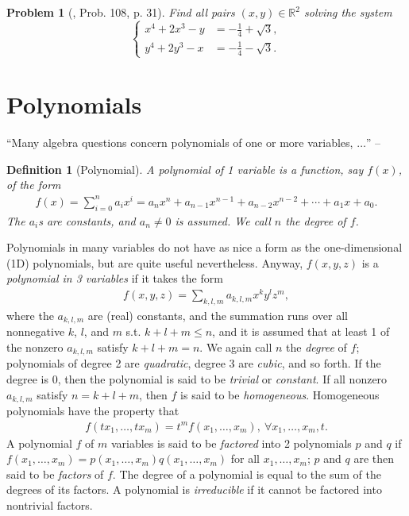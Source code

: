 \documentclass[oneside]{book}
\numberwithin{equation}{section}
\newtheorem{definition}{Definition}[section]
\newtheorem{problem}{Problem}[section]
\begin{document}
\begin{problem}[\cite{Gelca_Andreescu2017}, Prob. 108, p. 31]
	Find all pairs $(x,y)\in\mathbb{R}^2$ solving the system
	\begin{equation*}
		\left\{\begin{split}
			x^4 + 2x^3 - y &= -\frac{1}{4} + \sqrt{3},\\
			y^4 + 2y^3 - x &= -\frac{1}{4} - \sqrt{3}.
		\end{split}\right.
	\end{equation*}
\end{problem}

\section{Polynomials}
``Many algebra questions concern polynomials of one or more variables, $\ldots$'' -- \cite[p. 41]{Tao2006}

\begin{definition}[Polynomial]
	A \emph{polynomial of 1 variable} is a function, say $f(x)$, of the form
	\begin{align*}
		f(x) = \sum_{i=0}^n a_ix^i = a_nx^n + a_{n-1}x^{n-1} + a_{n-2}x^{n-2} + \cdots + a_1x + a_0.
	\end{align*}
	The $a_i$s are constants, and $a_n\ne 0$ is assumed. We call $n$ the \emph{degree} of $f$.
\end{definition}
Polynomials in many variables do not have as nice a form as the one-dimensional (1D) polynomials, but are quite useful nevertheless. Anyway, $f(x,y,z)$ is a \emph{polynomial in 3 variables} if it takes the form
\begin{align*}
	f(x,y,z) = \sum_{k,l,m} a_{k,l,m}x^ky^lz^m,
\end{align*}
where the $a_{k,l,m}$ are (real) constants, and the summation runs over all nonnegative $k$, $l$, and $m$ s.t. $k + l + m\le n$, and it is assumed that at least 1 of the nonzero $a_{k,l,m}$ satisfy $k + l + m = n$. We again call $n$ the \emph{degree} of $f$; polynomials of degree 2 are \textit{quadratic}, degree 3 are \emph{cubic}, and so forth. If the degree is 0, then the polynomial is said to be \emph{trivial} or \emph{constant}. If all nonzero $a_{k,l,m}$ satisfy $n = k + l + m$, then $f$ is said to be \emph{homogeneous}. Homogeneous polynomials have the property that
\begin{align*}
	f(tx_1,\ldots,tx_m) = t^mf(x_1,\ldots,x_m),\ \forall x_1,\ldots,x_m,t.
\end{align*}
A polynomial $f$ of $m$ variables is said to be \emph{factored} into 2 polynomials $p$ and $q$ if $f(x_1,\ldots,x_m) = p(x_1,\ldots,x_m)q(x_1,\ldots,x_m)$ for all $x_1,\ldots,x_m$; $p$ and $q$ are then said to be \emph{factors} of $f$. The degree of a polynomial is equal to the sum of the degrees of its factors. A polynomial is \emph{irreducible} if it cannot be factored into nontrivial factors.
\end{document}
